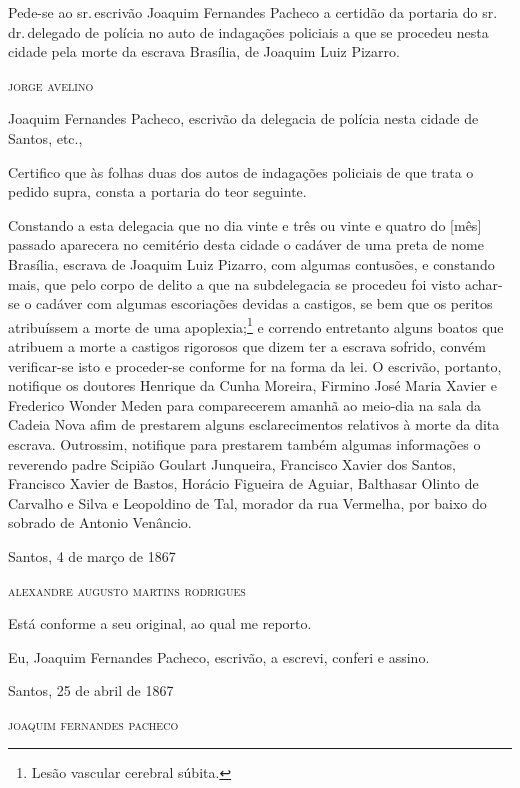 Pede-se ao sr.\,escrivão Joaquim Fernandes Pacheco a certidão da portaria
do sr.\,dr.\,delegado de polícia no auto de indagações policiais a que se
procedeu nesta cidade pela morte da escrava Brasília, de Joaquim Luiz
Pizarro.

\begin{flushright}
\textsc{jorge avelino}
\end{flushright}

Joaquim Fernandes Pacheco,
escrivão da delegacia de polícia nesta cidade de Santos, etc.,

Certifico que às folhas duas dos autos de indagações policiais
de que trata o pedido supra, consta a portaria do teor seguinte.

Constando a esta delegacia que no dia vinte e três ou vinte e quatro do
{[}mês{]} passado aparecera no cemitério desta cidade o cadáver de uma
preta de nome Brasília, escrava de Joaquim Luiz Pizarro, com algumas
contusões, e constando mais, que pelo corpo de delito a que na
subdelegacia se procedeu foi visto achar-se o cadáver com algumas
escoriações devidas a castigos, se bem que os peritos atribuíssem a
morte de uma apoplexia;\footnote{ Lesão vascular cerebral súbita.} e
correndo entretanto alguns boatos que atribuem a morte a castigos
rigorosos que dizem ter a escrava sofrido, convém verificar-se isto e
proceder-se conforme for na forma da lei. O escrivão, portanto, notifique
os doutores Henrique da Cunha Moreira, Firmino José Maria Xavier e
Frederico Wonder Meden para comparecerem amanhã ao meio-dia na sala da
Cadeia Nova afim de prestarem alguns esclarecimentos relativos à morte
da dita escrava. Outrossim, notifique para prestarem também algumas
informações o reverendo padre Scipião Goulart Junqueira, Francisco
Xavier dos Santos, Francisco Xavier de Bastos, Horácio Figueira de
Aguiar, Balthasar Olinto de Carvalho e Silva e Leopoldino de Tal,
morador da rua Vermelha, por baixo do sobrado de Antonio Venâncio.

\begin{flushright}
Santos, 4 de março de 1867

\textsc{alexandre augusto martins rodrigues}
\end{flushright}

Está conforme a seu original, ao qual me reporto.

Eu, Joaquim Fernandes Pacheco, escrivão, a escrevi, conferi e assino.

\begin{flushright}
Santos, 25 de abril de 1867

\textsc{joaquim fernandes pacheco}
\end{flushright}

